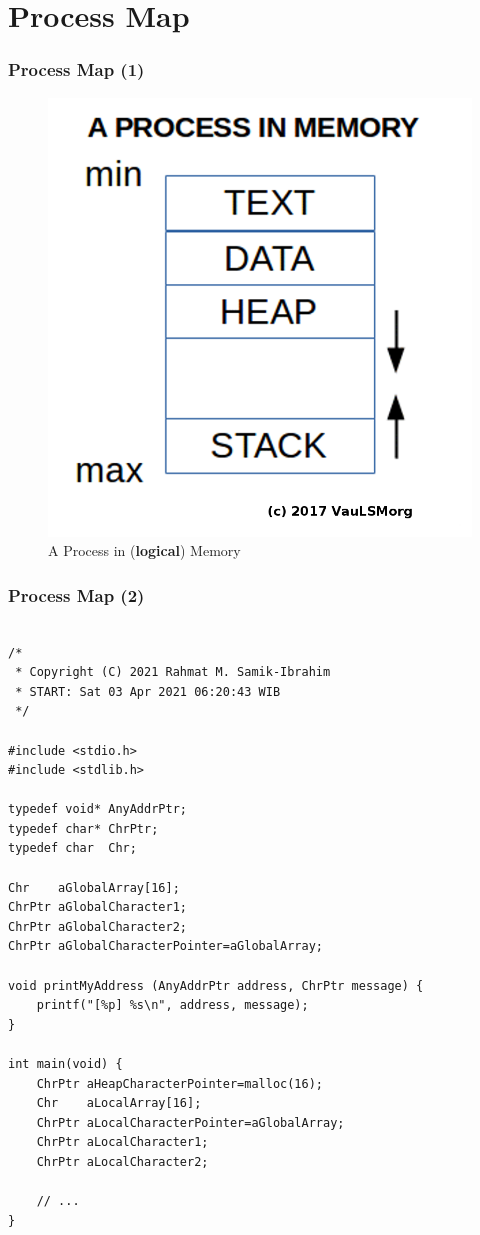 \documentclass[aspectratio=169, xcolor=table, notheorems, hyperref={pdfpagelabels=false}]{beamer}
\begin{document}
\section{Process Map}
\begin{frame}[fragile]
\frametitle{Process Map (1)}
\begin{figure}
\includegraphics[width=0.43\linewidth]{os06-memory}
\caption{A Process in (\textbf{logical}) Memory}
\end{figure}
\end{frame}

\begin{frame}[fragile]
\frametitle{Process Map (2)}
\begin{lstlisting}[basicstyle=\ttfamily\tiny]         % 108

/*
 * Copyright (C) 2021 Rahmat M. Samik-Ibrahim
 * START: Sat 03 Apr 2021 06:20:43 WIB
 */

#include <stdio.h>
#include <stdlib.h>

typedef void* AnyAddrPtr;
typedef char* ChrPtr;
typedef char  Chr;

Chr    aGlobalArray[16];
ChrPtr aGlobalCharacter1;
ChrPtr aGlobalCharacter2;
ChrPtr aGlobalCharacterPointer=aGlobalArray;

void printMyAddress (AnyAddrPtr address, ChrPtr message) {
    printf("[%p] %s\n", address, message);
}

int main(void) {
    ChrPtr aHeapCharacterPointer=malloc(16);
    Chr    aLocalArray[16];
    ChrPtr aLocalCharacterPointer=aGlobalArray;
    ChrPtr aLocalCharacter1;
    ChrPtr aLocalCharacter2;

    // ...
}

\end{lstlisting}
\end{frame}
\end{document}
